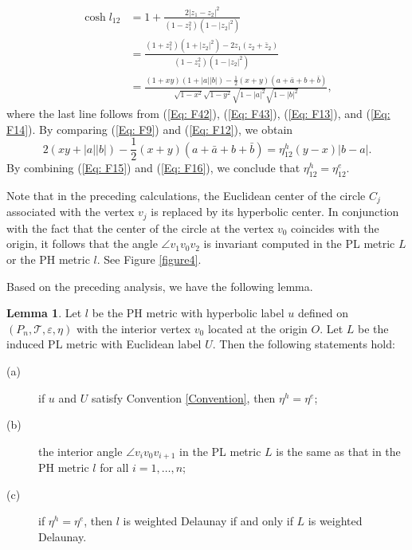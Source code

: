 \documentclass[12pt]{amsart}
\theoremstyle{definition}
\newtheorem{lemma}[theorem]{Lemma}
\begin{document}
\begin{equation}\label{Eq: F12}
\begin{aligned}
\cosh l_{12}
&=1+\frac{2|z_1-z_2|^2}{(1-z_1^2)(1-|z_2|^2)}\\
&=\frac{(1+z_1^2)(1+|z_2|^2)-2z_1(z_2+\bar{z}_2)}{(1-z_1^2)(1-|z_2|^2)}\\
&=\frac{(1+xy)(1+|a||b|)-\frac{1}{2}(x+y)(a+\bar{a}+b+\bar{b})}{\sqrt{1-x^2}\sqrt{1-y^2}\sqrt{1-|a|^2}\sqrt{1-|b|^2}},
\end{aligned}
\end{equation}
where the last line follows from (\ref{Eq: F42}), (\ref{Eq: F43}), (\ref{Eq: F13}), and (\ref{Eq: F14}).
By comparing (\ref{Eq: F9}) and (\ref{Eq: F12}), we obtain
\begin{equation}\label{Eq: F16}
2(xy+|a||b|)-\frac{1}{2}(x+y)(a+\bar{a}+b+\bar{b})
=\eta^h_{12}(y-x)|b-a|.
\end{equation}
By combining (\ref{Eq: F15}) and (\ref{Eq: F16}), we conclude that $\eta_{12}^h=\eta_{12}^e$.

Note that in the preceding calculations, the Euclidean center of the circle $C_j$ associated with the vertex $v_j$ is replaced by its hyperbolic center.
In conjunction with the fact that the center of the circle at the vertex $v_0$ coincides with the origin,
it follows that the angle $\angle v_1v_0v_2$ is invariant computed in the PL metric $L$ or the PH metric $l$.
See Figure \ref{figure4}.

Based on the preceding analysis, we have the following lemma.

\begin{lemma}\label{Lem: PH-PL}
Let $l$ be the PH metric with hyperbolic label $u$ defined on $(P_n, \mathcal{T}, \varepsilon, \eta)$ with the interior vertex $v_0$ located at the origin $O$.
Let $L$ be the induced PL metric with Euclidean label $U$.
Then the following statements hold:
\begin{description}
\item[(a)] if $u$ and $U$ satisfy Convention \ref{Convention}, then $\eta^h=\eta^e$;
\item[(b)] the interior angle $\angle v_iv_0v_{i+1}$ in the PL metric $L$ is the same as that in the PH metric $l$ for all $i=1,\dots,n$;
\item[(c)] if $\eta^h=\eta^e$, then $l$ is weighted Delaunay if and only if $L$ is weighted Delaunay.
\end{description}
\end{lemma}

\end{document}
